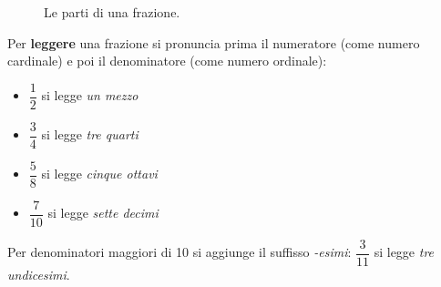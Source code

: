 \begin{figure}[htb]
    \centering
    \caption{Le parti di una frazione.}
\end{figure}

\begin{regola}
    Per \textbf{leggere} una frazione si pronuncia prima il numeratore
    (come numero cardinale) e poi il denominatore (come numero ordinale):
    \begin{itemize}[leftmargin=1.5em, itemsep=2pt]
        \item $\dfrac{1}{2}$ si legge \emph{un mezzo}
        \item $\dfrac{3}{4}$ si legge \emph{tre quarti}
        \item $\dfrac{5}{8}$ si legge \emph{cinque ottavi}
        \item $\dfrac{7}{10}$ si legge \emph{sette decimi}
    \end{itemize}
    Per denominatori maggiori di 10 si aggiunge il suffisso \emph{-esimi}:
    $\dfrac{3}{11}$ si legge \emph{tre undicesimi}.
\end{regola}


